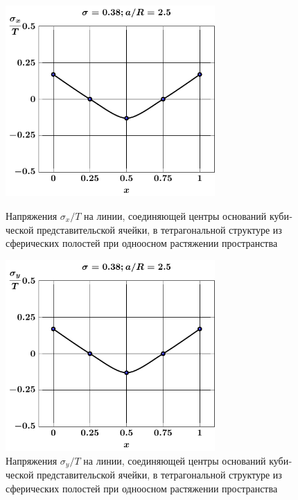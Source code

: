 \begin{russian}
\begin{figure}[h!]
\centering\footnotesize
\parbox[b]{7.5cm}{\centering\includegraphics[width=8cm]{cav8-a25-c-c-sig_x-spheres.pdf}
\caption{Напряжения $\sigma_x/T$ на линии, соединяющей центры оснований кубической представительской ячейки, в тетрагональной структуре из сферических полостей при одноосном растяжении пространства
\label{f:8:9}}}\hfil\hfil
\parbox[b]{7.5cm}{\centering\includegraphics[width=8cm]{cav8-a25-c-c-sig_y-spheres.pdf}
\caption{Напряжения $\sigma_y/T$ на линии, соединяющей центры оснований кубической представительской ячейки, в тетрагональной структуре из сферических полостей при одноосном растяжении пространства
\label{f:8:10}}}
\end{figure}

%


\end{russian}
